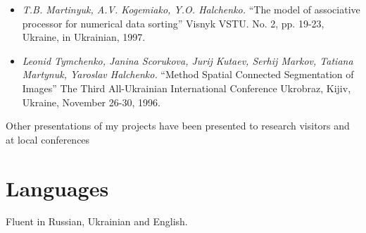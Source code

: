 \documentclass[10pt,overlapped,line]{res}
\newcommand{\mtitle}[1]{``#1''}
\newcommand{\mauthors}[1]{ \textit{#1.}}
\newcommand{\mwhere}[1]{#1.}
\begin{document}
\begin{resume}
\begin{itemize}
  \item 
    \mauthors{T.B. Martinyuk, A.V. Kogemiako, Y.O. Halchenko} 
    \mtitle{The model of associative processor for numerical data sorting} 
    \mwhere{ Visnyk VSTU. No. 2, pp. 19-23, Ukraine, in Ukrainian, 1997}

  \item 
    \mauthors{Leonid Tymchenko, Janina Scorukova, Jurij Kutaev, Serhij Markov, Tatiana Martynuk, Yaroslav Halchenko} 
    \mtitle{Method Spatial Connected Segmentation of Images}
    \mwhere{The Third All-Ukrainian International Conference Ukrobraz, Kijiv, Ukraine, November 26-30, 1996}
\end{itemize}

Other presentations of my projects have been presented to research visitors and at local conferences

\section{Languages}
Fluent in Russian, Ukrainian and English. 



\end{resume}
\end{document}
